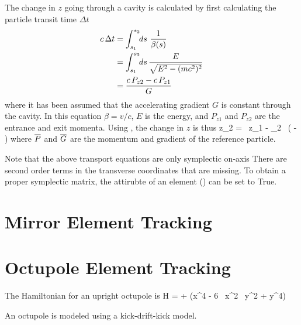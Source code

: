 The change in $z$ going through a cavity is calculated by first calculating the particle
transit time $\Delta t$
\begin{align}
  c \, \Delta t &= \int_{s_1}^{s_2} \!\! ds \,\, \frac{1}{\beta(s)} \nonumber \\
  &= \int_{s_1}^{s_2} \!\! ds \, \frac{E}{\sqrt{E^2 - (mc^2)^2}} \\
  &= \frac{c \, P_{z2} - c \, P_{z1}}{G} \nonumber
\end{align}
where it has been assumed that the accelerating gradient $G$ is
constant through the cavity. In this equation $\beta = v / c$, $E$ is
the energy, and $P_{z1}$ and $P_{z2}$ are the entrance and exit
momenta. Using , the change in $z$ is thus
\Begineq
  z_2 =  \, z_1 - 
  \beta_2 \, 
  \left(
   - 
  \right)
\Endeq
where $\overline{P}$ and $\overline{G}$ are the momentum and gradient of the
reference particle.

Note that the above transport equations are only symplectic on-axis
There are second order terms in the transverse coordinates that are
missing. To obtain a proper symplectic matrix, the 
attirubte of an  element () can be set to
True.

\section{Mirror Element Tracking}
\label{s:mirror.std}

\section{Octupole Element Tracking}
\label{s:octupole.std}

The Hamiltonian for an upright octupole is
\Begineq
  H =  +  (x^4 - 6 \, x^2 \, y^2 + y^4)
\Endeq

An octupole is modeled using a kick-drift-kick model.

